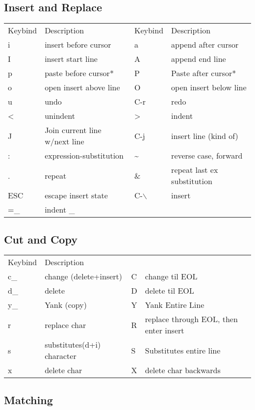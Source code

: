 \documentclass[11pt]{article}
\begin{document}
\subsection{Insert and Replace}
\label{sec:org2b893f3}
\begin{center}
\begin{tabular}{llll}
Keybind & Description & Keybind & Description\\
i & insert before cursor & a & append after cursor\\
I & insert start line & A & append end line\\
p & paste before cursor* & P & Paste after cursor*\\
o & open insert above line & O & open insert below line\\
u & undo & C-r & redo\\
< & unindent & > & indent\\
J & Join current line w/next line & C-j & insert line (kind of)\\
: & expression-substitution & \textasciitilde{} & reverse case, forward\\
. & repeat & \& & repeat last ex substitution\\
ESC & escape insert state & C-$\backslash$ & insert\\
=\_ & indent \_ &  & \\
\end{tabular}
\end{center}
\subsection{Cut and Copy}
\label{sec:org4ca2375}
\begin{center}
\begin{tabular}{llll}
Keybind & Description &  & \\
c\_ & change (delete+insert) & C & change til EOL\\
d\_ & delete & D & delete til EOL\\
y\_ & Yank (copy) & Y & Yank Entire Line\\
r & replace char & R & replace through EOL, then enter insert\\
s & substitutes(d+i) character & S & Substitutes entire line\\
x & delete char & X & delete char backwards\\
\end{tabular}
\end{center}
\subsection{Matching}
\label{sec:org00c8b0f}
\end{document}
